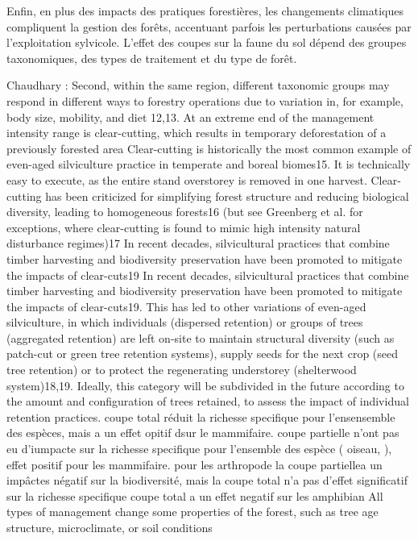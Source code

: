 Enfin, en plus des impacts des pratiques forestières, les changements climatiques compliquent la gestion des forêts, accentuant parfois les perturbations causées par l'exploitation sylvicole. 
L'effet des coupes sur la faune du sol dépend des groupes taxonomiques, des types de traitement et du type de forêt.

Chaudhary : Second, within the same region, different taxonomic groups may respond in different ways to forestry operations due to variation in, for example, body size, mobility, and diet 12,13.
At an extreme end of the management intensity range is clear-cutting, which results in temporary deforestation of a previously forested area
Clear-cutting is historically the most common example of even-aged  silviculture practice in temperate and boreal biomes15. It is technically easy to execute, as the entire stand overstorey is removed in one harvest. 
Clear-cutting has been criticized for simplifying forest structure and reducing  biological diversity, leading to homogeneous forests16 (but see Greenberg et al. for exceptions, where clear-cutting  is found to mimic high intensity natural disturbance regimes)17
In recent decades, silvicultural practices that combine timber harvesting and biodiversity preservation have been promoted to mitigate the impacts of clear-cuts19 
In recent decades, silvicultural practices that combine timber harvesting and biodiversity preservation have been promoted to mitigate the impacts of clear-cuts19. 
This has led to other variations of even-aged silviculture, in which individuals (dispersed retention) or groups of trees (aggregated retention) are left on-site to maintain structural diversity (such as patch-cut or green tree retention systems), supply seeds for the next crop (seed tree retention) or to protect the regenerating understorey (shelterwood  system)18,19. 
Ideally, this category will be subdivided in the future according to the amount and configuration of trees retained, to assess the impact of individual retention practices.
coupe total réduit la richesse specifique pour l'ensensemble des espèces, mais a un effet opitif dsur le mammifaire.
coupe partielle n'ont pas eu d'iumpacte sur la richesse specifique pour l'ensemble des espèce ( oiseau, ), effet positif pour les mammifaire.
pour les arthropode la coupe partiellea un impâctes négatif sur la biodiversité, mais la coupe total n'a pas d'effet significatif sur la richesse specifique
coupe total a un effet negatif sur les amphibian
All types of management change some properties of the forest, such as tree age structure, microclimate, or soil conditions
